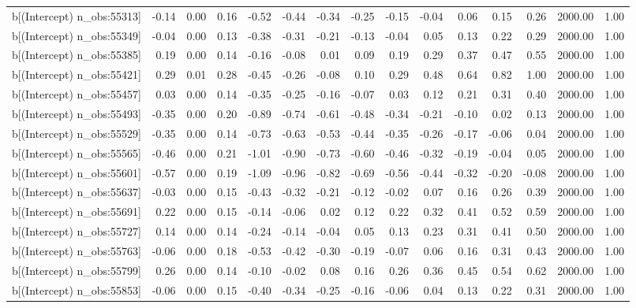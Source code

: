 \begin{table}[ht]
\begin{tabular}{rrrrrrrrrrrrrrr}
  b[(Intercept) n\_obs:55313] & -0.14 & 0.00 & 0.16 & -0.52 & -0.44 & -0.34 & -0.25 & -0.15 & -0.04 & 0.06 & 0.15 & 0.26 & 2000.00 & 1.00 \\ 
  b[(Intercept) n\_obs:55349] & -0.04 & 0.00 & 0.13 & -0.38 & -0.31 & -0.21 & -0.13 & -0.04 & 0.05 & 0.13 & 0.22 & 0.29 & 2000.00 & 1.00 \\ 
  b[(Intercept) n\_obs:55385] & 0.19 & 0.00 & 0.14 & -0.16 & -0.08 & 0.01 & 0.09 & 0.19 & 0.29 & 0.37 & 0.47 & 0.55 & 2000.00 & 1.00 \\ 
  b[(Intercept) n\_obs:55421] & 0.29 & 0.01 & 0.28 & -0.45 & -0.26 & -0.08 & 0.10 & 0.29 & 0.48 & 0.64 & 0.82 & 1.00 & 2000.00 & 1.00 \\ 
  b[(Intercept) n\_obs:55457] & 0.03 & 0.00 & 0.14 & -0.35 & -0.25 & -0.16 & -0.07 & 0.03 & 0.12 & 0.21 & 0.31 & 0.40 & 2000.00 & 1.00 \\ 
  b[(Intercept) n\_obs:55493] & -0.35 & 0.00 & 0.20 & -0.89 & -0.74 & -0.61 & -0.48 & -0.34 & -0.21 & -0.10 & 0.02 & 0.13 & 2000.00 & 1.00 \\ 
  b[(Intercept) n\_obs:55529] & -0.35 & 0.00 & 0.14 & -0.73 & -0.63 & -0.53 & -0.44 & -0.35 & -0.26 & -0.17 & -0.06 & 0.04 & 2000.00 & 1.00 \\ 
  b[(Intercept) n\_obs:55565] & -0.46 & 0.00 & 0.21 & -1.01 & -0.90 & -0.73 & -0.60 & -0.46 & -0.32 & -0.19 & -0.04 & 0.05 & 2000.00 & 1.00 \\ 
  b[(Intercept) n\_obs:55601] & -0.57 & 0.00 & 0.19 & -1.09 & -0.96 & -0.82 & -0.69 & -0.56 & -0.44 & -0.32 & -0.20 & -0.08 & 2000.00 & 1.00 \\ 
  b[(Intercept) n\_obs:55637] & -0.03 & 0.00 & 0.15 & -0.43 & -0.32 & -0.21 & -0.12 & -0.02 & 0.07 & 0.16 & 0.26 & 0.39 & 2000.00 & 1.00 \\ 
  b[(Intercept) n\_obs:55691] & 0.22 & 0.00 & 0.15 & -0.14 & -0.06 & 0.02 & 0.12 & 0.22 & 0.32 & 0.41 & 0.52 & 0.59 & 2000.00 & 1.00 \\ 
  b[(Intercept) n\_obs:55727] & 0.14 & 0.00 & 0.14 & -0.24 & -0.14 & -0.04 & 0.05 & 0.13 & 0.23 & 0.31 & 0.41 & 0.50 & 2000.00 & 1.00 \\ 
  b[(Intercept) n\_obs:55763] & -0.06 & 0.00 & 0.18 & -0.53 & -0.42 & -0.30 & -0.19 & -0.07 & 0.06 & 0.16 & 0.31 & 0.43 & 2000.00 & 1.00 \\ 
  b[(Intercept) n\_obs:55799] & 0.26 & 0.00 & 0.14 & -0.10 & -0.02 & 0.08 & 0.16 & 0.26 & 0.36 & 0.45 & 0.54 & 0.62 & 2000.00 & 1.00 \\ 
  b[(Intercept) n\_obs:55853] & -0.06 & 0.00 & 0.15 & -0.40 & -0.34 & -0.25 & -0.16 & -0.06 & 0.04 & 0.13 & 0.22 & 0.31 & 2000.00 & 1.00 \\ 

\end{tabular}
\end{table}
